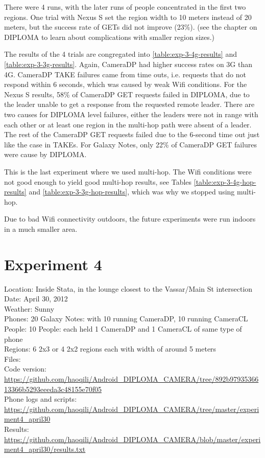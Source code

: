 There were 4 runs, with the later runs of people concentrated in the first two regions. One trial with Nexus S set the region width to 10 meters instead of 20 meters, but the success rate of GETs did not improve (23\%). (see the chapter on DIPLOMA to learn about complications with smaller region sizes.)

The results of the 4 trials are congregated into \ref{table:exp-3-4g-results} and \ref{table:exp-3-3g-results}. Again, CameraDP had higher success rates on 3G than 4G.  CameraDP TAKE failures came from time outs, i.e. requests that do not respond within 6 seconds, which was caused by weak Wifi conditions. For the Nexus S results, 58\% of CameraDP GET requests failed in DIPLOMA, due to the leader unable to get a response from the requested remote leader. There are two causes for DIPLOMA level failures, either the leaders were not in range with each other or at least one region in the multi-hop path were absent of a leader. The rest of the CameraDP GET requests failed due to the 6-second time out just like the case in TAKEs. For Galaxy Notes, only 22\% of CameraDP GET failures were cause by DIPLOMA.

This is the last experiment where we used multi-hop. The Wifi conditions were not good enough to yield good multi-hop results, see Tables \ref{table:exp-3-4g-hop-results} and \ref{table:exp-3-3g-hop-results}, which was why we stopped using multi-hop.

Due to bad Wifi connectivity outdoors, the future experiments were run indoors in a much smaller area.

\section{Experiment 4}

Location: Inside Stata, in the lounge closest to the Vassar/Main St intersection\\
Date: April 30, 2012\\
Weather: Sunny\\
Phones: 20 Galaxy Notes: with 10 running CameraDP, 10 running CameraCL\\
People: 10 People: each held 1 CameraDP and 1 CameraCL of same type of phone\\
Regions: 6 2x3 or 4 2x2 regions each with width of around 5 meters\\
Files:\\
Code version: {\url{https://github.com/haoqili/Android_DIPLOMA_CAMERA/tree/892b9793536613366b5293eeeda3c48155e70f05}}\\
Phone logs and scripts: {\url{https://github.com/haoqili/Android_DIPLOMA_CAMERA/tree/master/experiment4_april30}}\\ 
Results: {\url{https://github.com/haoqili/Android_DIPLOMA_CAMERA/blob/master/experiment4_april30/results.txt}}\\

